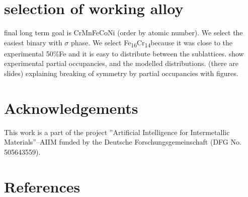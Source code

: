 \documentclass[superscriptaddress, 12pt]{revtex4-2}%
\newcommand{\fecrnominal}{Fe\textsubscript{16}Cr\textsubscript{14}}
\begin{document}
\section{selection of working alloy}
final long term goal is CrMnFeCoNi (order by atomic number).
We select the easiest binary with $\sigma$ phase.
We select \fecrnominal because it was close to the experimental 50\%Fe and it is easy to distribute between the sublattices.
show experimental partial occupancies, and the modelled distributions.
(there are slides)
explaining breaking of symmetry by partial occupancies with figures.

\section*{Acknowledgements} 

This work is a part of the project ”Artificial Intelligence for Intermetallic Materials”–AIIM funded by the Deutsche Forschungsgemeinschaft (DFG No. 505643559). 

\section{References}
 

\end{document}
